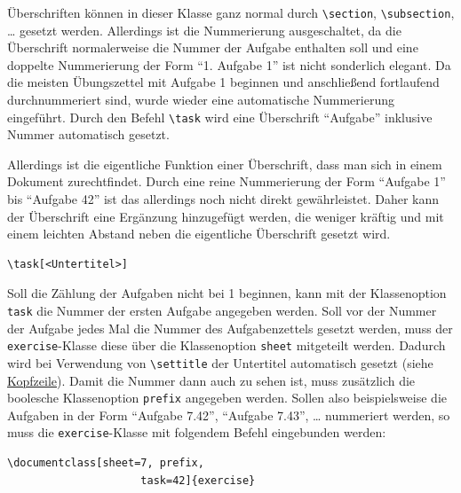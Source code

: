 \documentclass{exercise}
\begin{document}
  \label{section-aufgaben}
    Überschriften können in dieser Klasse ganz normal durch \lstinline{\section}, \lstinline{\subsection}, \ldots{} gesetzt werden. Allerdings ist die Nummerierung ausgeschaltet, da die Überschrift normalerweise die Nummer der Aufgabe enthalten soll und eine doppelte Nummerierung der Form \enquote{1. Aufgabe 1} ist nicht sonderlich elegant. Da die meisten Übungszettel mit Aufgabe 1 beginnen und anschließend fortlaufend durchnummeriert sind, wurde wieder eine automatische Nummerierung eingeführt. Durch den Befehl \lstinline-\task- wird eine Überschrift \enquote{Aufgabe} inklusive Nummer automatisch gesetzt.

    Allerdings ist die eigentliche Funktion einer Überschrift, dass man sich in einem Dokument zurechtfindet. Durch eine reine Nummerierung der Form \enquote{Aufgabe 1} bis \enquote{Aufgabe 42} ist das allerdings noch nicht direkt gewährleistet. Daher kann der Überschrift eine Ergänzung hinzugefügt werden, die weniger kräftig und mit einem leichten Abstand neben die eigentliche Überschrift gesetzt wird.
    \begin{lstlisting}[gobble=6]
      \task[<Untertitel>]
    \end{lstlisting}

    Soll die Zählung der Aufgaben nicht bei 1 beginnen, kann mit der Klassenoption \texttt{task} die Nummer der ersten Aufgabe angegeben werden. Soll vor der Nummer der Aufgabe jedes Mal die Nummer des Aufgabenzettels gesetzt werden, muss der \texttt{exercise}-Klasse diese über die Klassenoption \lstinline{sheet} mitgeteilt werden. Dadurch wird bei Verwendung von \lstinline-\settitle- der Untertitel automatisch gesetzt (siehe \hyperref[section-kopfzeile]{Kopfzeile}). Damit die Nummer dann auch zu sehen ist, muss zusätzlich die boolesche Klassenoption \lstinline{prefix} angegeben werden. Sollen also beispielsweise die Aufgaben in der Form \enquote{Aufgabe 7.42}, \enquote{Aufgabe 7.43}, \ldots{} nummeriert werden, so muss die \texttt{exercise}-Klasse mit folgendem Befehl eingebunden werden:
    \begin{lstlisting}[gobble=6]
      \documentclass[sheet=7, prefix,
                     task=42]{exercise}
    \end{lstlisting}
\end{document}
